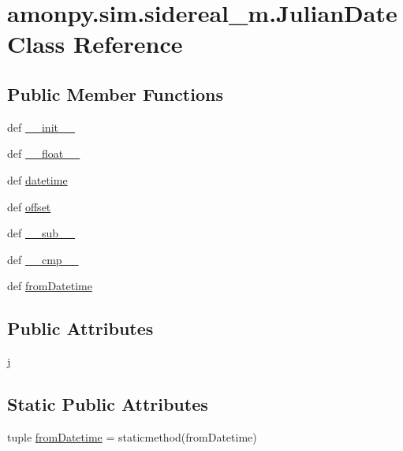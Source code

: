 \hypertarget{classamonpy_1_1sim_1_1sidereal__m_1_1_julian_date}{\section{amonpy.\-sim.\-sidereal\-\_\-m.\-Julian\-Date Class Reference}
\label{classamonpy_1_1sim_1_1sidereal__m_1_1_julian_date}
}
\subsection*{Public Member Functions}
\begin{DoxyCompactItemize}
\item 
def \hyperlink{classamonpy_1_1sim_1_1sidereal__m_1_1_julian_date_aa5d1ecfd1d23140c37c473da88789f34}{\-\_\-\-\_\-init\-\_\-\-\_\-}
\item 
def \hyperlink{classamonpy_1_1sim_1_1sidereal__m_1_1_julian_date_ad89c927e0354e86297b6975b403cfe50}{\-\_\-\-\_\-float\-\_\-\-\_\-}
\item 
def \hyperlink{classamonpy_1_1sim_1_1sidereal__m_1_1_julian_date_ab92c3edf4c241c001b6d8e243b32a005}{datetime}
\item 
def \hyperlink{classamonpy_1_1sim_1_1sidereal__m_1_1_julian_date_ab19c7d5fb7cdefdb24c42ebc9af6b0e7}{offset}
\item 
def \hyperlink{classamonpy_1_1sim_1_1sidereal__m_1_1_julian_date_a5a4e15a49c08ec8ae3f20f95a381fb53}{\-\_\-\-\_\-sub\-\_\-\-\_\-}
\item 
def \hyperlink{classamonpy_1_1sim_1_1sidereal__m_1_1_julian_date_ad80629902a7bbd94722a53deb690504b}{\-\_\-\-\_\-cmp\-\_\-\-\_\-}
\item 
def \hyperlink{classamonpy_1_1sim_1_1sidereal__m_1_1_julian_date_a6d5720248c65bd554f5015aa34168ac5}{from\-Datetime}
\end{DoxyCompactItemize}
\subsection*{Public Attributes}
\begin{DoxyCompactItemize}
\item 
\hyperlink{classamonpy_1_1sim_1_1sidereal__m_1_1_julian_date_abfaf0b8875ebeebf2b55372f0f08ad2c}{j}
\end{DoxyCompactItemize}
\subsection*{Static Public Attributes}
\begin{DoxyCompactItemize}
\item 
tuple \hyperlink{classamonpy_1_1sim_1_1sidereal__m_1_1_julian_date_a1e1700d98b10b6aef67f55af0d20d007}{from\-Datetime} = staticmethod(from\-Datetime)
\end{DoxyCompactItemize}


